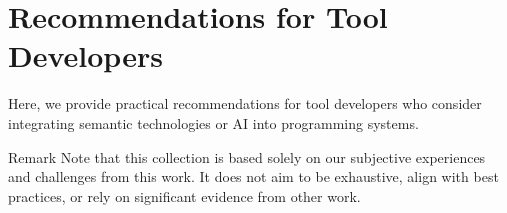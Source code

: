 
\chapter{Recommendations for Tool Developers}
\label{apx:recommendations}

Here, we provide practical recommendations for tool developers who consider integrating semantic technologies or AI into programming systems.

\begin{genericbox}{Remark}
	Note that this collection is based solely on our subjective experiences and challenges from this work.
	It does not aim to be exhaustive, align with best practices, or rely on significant evidence from other work.
\end{genericbox}

